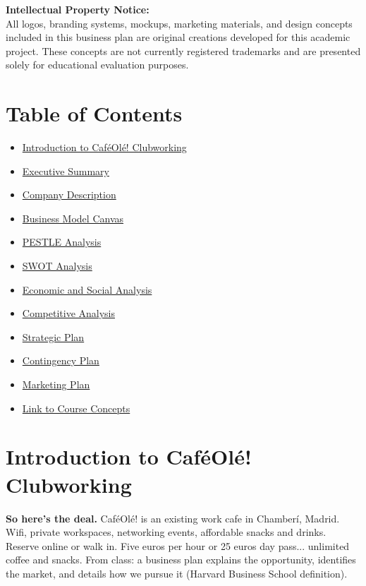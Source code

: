\documentclass[12pt,a4paper]{article}
\begin{document}
\textbf{Intellectual Property Notice:}\\
All logos, branding systems, mockups, marketing materials, and design concepts included in this business plan are original creations developed for this academic project. These concepts are not currently registered trademarks and are presented solely for educational evaluation purposes.
\normalsize
\newpage

\section*{\color{sectionblue}Table of Contents}
\begin{itemize}[leftmargin=*,nosep]
\item \hyperref[sec:intro]{\textcolor{charcoal}{Introduction to Caf\'eOl\'e! Clubworking}}
\item \hyperref[sec:exec]{\textcolor{charcoal}{Executive Summary}}
\item \hyperref[sec:company]{\textcolor{charcoal}{Company Description}}
\item \hyperref[sec:bmc]{\textcolor{charcoal}{Business Model Canvas}}
\item \hyperref[sec:pestle]{\textcolor{charcoal}{PESTLE Analysis}}
\item \hyperref[sec:swot]{\textcolor{charcoal}{SWOT Analysis}}
\item \hyperref[sec:economic]{\textcolor{charcoal}{Economic and Social Analysis}}
\item \hyperref[sec:competition]{\textcolor{charcoal}{Competitive Analysis}}
\item \hyperref[sec:strategy]{\textcolor{charcoal}{Strategic Plan}}
\item \hyperref[sec:contingency]{\textcolor{charcoal}{Contingency Plan}}
\item \hyperref[sec:marketing]{\textcolor{charcoal}{Marketing Plan}}
\item \hyperref[sec:venture]{\textcolor{charcoal}{Link to Course Concepts}}
\end{itemize}
\newpage

\section*{\color{sectionblue}Introduction to Caf\'eOl\'e! Clubworking}\label{sec:intro}

\textbf{So here's the deal.} Caf\'eOl\'e! is an existing work cafe in Chamber\'i, Madrid. Wifi, private workspaces, networking events, affordable snacks and drinks. Reserve online or walk in. Five euros per hour or 25 euros day pass... unlimited coffee and snacks. From class: a business plan explains the opportunity, identifies the market, and details how we pursue it (Harvard Business School definition).
\end{document}
